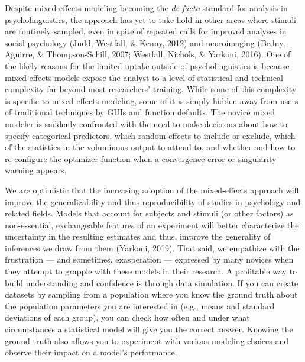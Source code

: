 \documentclass[
  english,
  doc,floatsintext]{apa6}
\begin{document}
Despite mixed-effects modeling becoming the \emph{de facto} standard for analysis in psycholinguistics, the approach has yet to take hold in other areas where stimuli are routinely sampled, even in spite of repeated calls for improved analyses in social psychology (Judd, Westfall, \& Kenny, 2012) and neuroimaging (Bedny, Aguirre, \& Thompson-Schill, 2007; Westfall, Nichols, \& Yarkoni, 2016). One of the likely reasons for the limited uptake outside of psycholinguistics is because mixed-effects models expose the analyst to a level of statistical and technical complexity far beyond most researchers' training. While some of this complexity is specific to mixed-effects modeling, some of it is simply hidden away from users of traditional techniques by GUIs and function defaults. The novice mixed modeler is suddenly confronted with the need to make decisions about how to specify categorical predictors, which random effects to include or exclude, which of the statistics in the voluminous output to attend to, and whether and how to re-configure the optimizer function when a convergence error or singularity warning appears.

We are optimistic that the increasing adoption of the mixed-effects approach will improve the generalizability and thus reproducibility of studies in psychology and related fields. Models that account for subjects and stimuli (or other factors) as non-essential, exchangeable features of an experiment will better characterize the uncertainty in the resulting estimates and thus, improve the generality of inferences we draw from them (Yarkoni, 2019). That said, we empathize with the frustration --- and sometimes, exasperation --- expressed by many novices when they attempt to grapple with these models in their research. A profitable way to build understanding and confidence is through data simulation. If you can create datasets by sampling from a population where you know the ground truth about the population parameters you are interested in (e.g., means and standard deviations of each group), you can check how often and under what circumstances a statistical model will give you the correct answer. Knowing the ground truth also allows you to experiment with various modeling choices and observe their impact on a model's performance.
\end{document}
